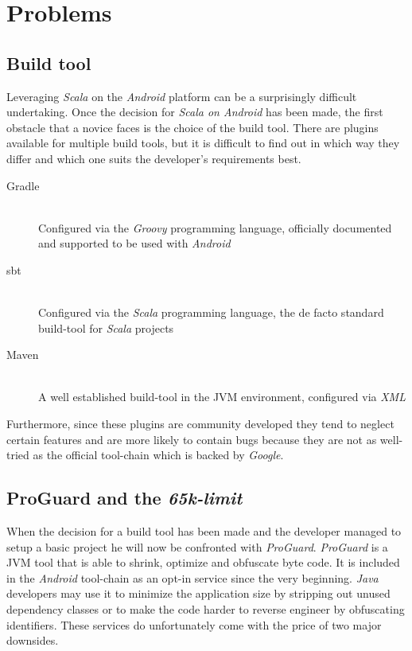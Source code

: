 \section{Problems}

\subsection{Build tool}

Leveraging \textit{Scala} on the \textit{Android} platform can be a surprisingly difficult undertaking. Once the decision for \textit{Scala on Android} has been made, the  first obstacle that a novice faces is the choice of the build tool. There are plugins available for multiple build tools, but it is difficult to find out in which way they differ and which one suits the developer's requirements best.

\begin{description}

	\item[Gradle]\hfill \\

	Configured via the \textit{Groovy} programming language, officially documented and supported to be used with \textit{Android}

	\item[\ac{sbt}]\hfill \\

	Configured via the \textit{Scala} programming language, the de facto standard build-tool for \textit{Scala} projects

	\item[Maven]\hfill \\

	A well established build-tool in the \ac{JVM} environment, configured via \textit{XML}

\end{description}

Furthermore, since these plugins are community developed they tend to neglect certain features and are more likely to contain bugs because they are not as well-tried as the official tool-chain which is backed by \textit{Google}.

\subsection{ProGuard and the \textit{65k-limit}}

When the decision for a build tool has been made and the developer managed to setup a basic project he will now be confronted with \textit{ProGuard}. \textit{ProGuard} is a \ac{JVM} tool that is able to shrink, optimize and obfuscate byte code. It is included in the \textit{Android} tool-chain as an opt-in service since the very beginning. \textit{Java} developers may use it to minimize the application size by stripping out unused dependency classes or to make the code harder to reverse engineer by obfuscating identifiers. These services do unfortunately come with the price of two major downsides.

